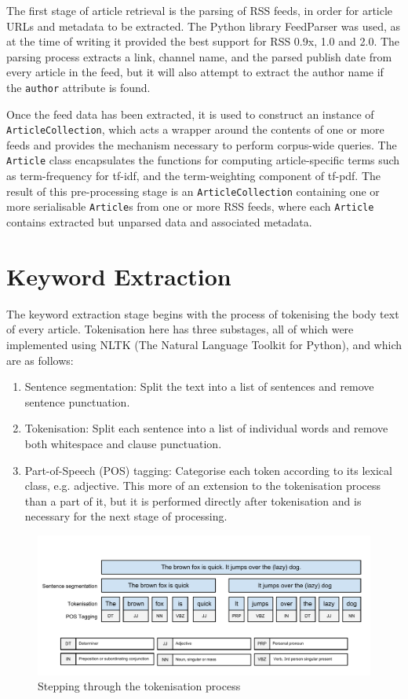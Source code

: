 The first stage of article retrieval is the parsing of RSS feeds, in order for article URLs and metadata to be extracted. The Python library FeedParser was used, as at the time of writing it provided the best support for RSS 0.9x, 1.0 and 2.0. The parsing process extracts a link, channel name, and the parsed publish date from every article in the feed, but it will also attempt to extract the author name if the \texttt{author} attribute is found.

Once the feed data has been extracted, it is used to construct an instance of \texttt{ArticleCollection}, which acts a wrapper around the contents of one or more feeds and provides the mechanism necessary to perform corpus-wide queries. The \texttt{Article} class encapsulates the functions for computing article-specific terms such as term-frequency for tf-idf, and the term-weighting component of tf-pdf. The result of this pre-processing stage is an \texttt{ArticleCollection} containing one or more serialisable \texttt{Article}s from one or more RSS feeds, where each \texttt{Article} contains extracted but unparsed data and associated metadata.

\section{Keyword Extraction} \label{sec:keys}

The keyword extraction stage begins with the process of tokenising the body text of every article. Tokenisation here has three substages, all of which were implemented using NLTK (The Natural Language Toolkit for Python), and which are as follows:
\begin{enumerate}
	\item Sentence segmentation: Split the text into a list of sentences and remove sentence punctuation.
	\item Tokenisation: Split each sentence into a list of individual words and remove both whitespace and clause punctuation.
	\item Part-of-Speech (POS) tagging: Categorise each token according to its lexical class, e.g. adjective. This more of an extension to the tokenisation process than a part of it, but it is performed directly after tokenisation and is necessary for the next stage of processing.
\end{enumerate}
\begin{figure}[htbp!]
	\centering
	\includegraphics[width=\textwidth]{img/implementation/Tokenisation.pdf}
	\caption{Stepping through the tokenisation process}
	\label{fig:tokenisation}
\end{figure}

